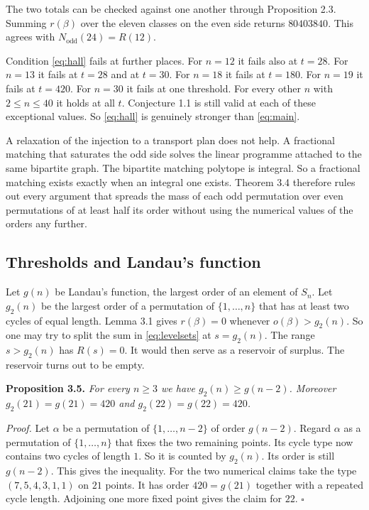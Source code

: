 \documentclass[10pt]{article}
\begin{document}
\medskip
The two totals can be checked against one another through Proposition 2.3. Summing
$r(\beta)$ over the eleven classes on the even side returns $80403840$. This agrees with
$N_{\mathrm{odd}}(24)=R(12)$.

Condition \eqref{eq:hall} fails at further places. For $n=12$ it fails also at $t=28$. For
$n=13$ it fails at $t=28$ and at $t=30$. For $n=18$ it fails at $t=180$. For $n=19$ it fails
at $t=420$. For $n=30$ it fails at one threshold. For every other $n$ with $2\le n\le40$ it
holds at all $t$. Conjecture 1.1 is still valid at each of these exceptional values. So
\eqref{eq:hall} is genuinely stronger than \eqref{eq:main}.

A relaxation of the injection to a transport plan does not help. A fractional matching that
saturates the odd side solves the linear programme attached to the same bipartite graph. The
bipartite matching polytope is integral. So a fractional matching exists exactly when an
integral one exists. Theorem 3.4 therefore rules out every argument that spreads the mass of
each odd permutation over even permutations of at least half its order without using the
numerical values of the orders any further.

\subsection*{Thresholds and Landau's function}

Let $g(n)$ be Landau's function, the largest order of an element of $S_n$. Let $g_2(n)$ be
the largest order of a permutation of $\{1,\dots,n\}$ that has at least two cycles of equal
length. Lemma 3.1 gives $r(\beta)=0$ whenever $o(\beta)>g_2(n)$. So one may try to split the
sum in \eqref{eq:levelsets} at $s=g_2(n)$. The range $s>g_2(n)$ has $R(s)=0$. It would then
serve as a reservoir of surplus. The reservoir turns out to be empty.

\medskip\noindent
\textbf{Proposition 3.5.} \emph{For every $n\ge3$ we have $g_2(n)\ge g(n-2)$. Moreover
$g_2(21)=g(21)=420$ and $g_2(22)=g(22)=420$.}

\medskip\noindent
\textit{Proof.} Let $\alpha$ be a permutation of $\{1,\dots,n-2\}$ of order $g(n-2)$. Regard
$\alpha$ as a permutation of $\{1,\dots,n\}$ that fixes the two remaining points. Its cycle
type now contains two cycles of length $1$. So it is counted by $g_2(n)$. Its order is still
$g(n-2)$. This gives the inequality. For the two numerical claims take the type
$(7,5,4,3,1,1)$ on $21$ points. It has order $420=g(21)$ together with a repeated cycle
length. Adjoining one more fixed point gives the claim for $22$. $\square$
\end{document}
